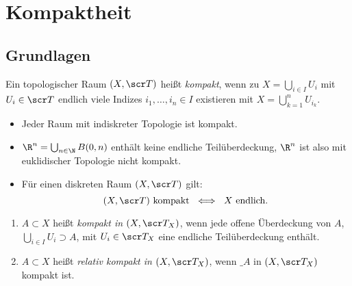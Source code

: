 \chapter{Kompaktheit}



\section{Grundlagen}


\begin{df} \label{df:compact_space}
	Ein topologischer Raum $(X, \scr T)$ heißt \emph{kompakt}, wenn zu $X = \bigcup_{i\in I} U_i$ mit $U_i \in \scr T$ endlich viele Indizes $i_1, \dotsc, i_n \in I$ existieren mit $X = \bigcup_{k=1}^n U_{i_k}$.
\end{df}

\begin{ex}
	\begin{itemize}
		\item
			Jeder Raum mit indiskreter Topologie ist kompakt.
		\item
			$\R^n = \bigcup_{n\in\N} B(0,n)$ enthält keine endliche Teilüberdeckung, $\R^n$ ist also mit euklidischer Topologie nicht kompakt.
		\item
			Für einen diskreten Raum $(X, \scr T)$ gilt:
			\[
				(X, \scr T) \text{ kompakt }
				\iff
				\text{ $X$ endlich}.
			\]
	\end{itemize}
\end{ex}

\begin{df} \label{df:compact_subspace}
	\begin{enumerate}[(1)]
		\item
			$A \subset X$ heißt \emph{kompakt in $(X, \scr T_X)$}, wenn jede offene Überdeckung von $A$, $\bigcup_{i\in I} U_i \supset A$, mit $U_i \in \scr T_X$ eine endliche Teilüberdeckung enthält.
		\item
			$A \subset X$ heißt \emph{relativ kompakt in $(X, \scr T_X)$}, wenn $\_A$ in $(X, \scr T_X)$ kompakt ist.
	\end{enumerate}
\end{df}

